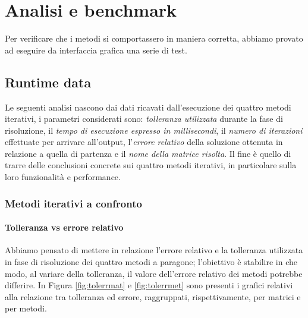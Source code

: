 \section{Analisi e benchmark}

Per verificare che i metodi si comportassero in maniera corretta, abbiamo provato ad eseguire da interfaccia grafica una serie di test.




\subsection{Runtime data}

Le seguenti analisi nascono dai dati ricavati dall'esecuzione dei quattro metodi iterativi, i parametri considerati sono: \textit{tolleranza utilizzata} durante la fase di risoluzione, il \textit{tempo di esecuzione espresso in millisecondi}, il \textit{numero di iterazioni} effettuate per arrivare all'output, l'\textit{errore relativo} della soluzione ottenuta in relazione a quella di partenza e il \textit{nome della matrice risolta}. Il fine è quello di trarre delle conclusioni concrete sui quattro metodi iterativi, in particolare sulla loro funzionalità e performance.

\subsubsection{Metodi iterativi a confronto}

\paragraph{Tolleranza vs errore relativo}
Abbiamo pensato di mettere in relazione l'errore relativo e la tolleranza utilizzata in fase di risoluzione dei quattro metodi a paragone; l'obiettivo è stabilire in che modo, al variare della tolleranza, il valore dell'errore relativo dei metodi potrebbe differire. In Figura \ref{fig:tolerrmat} e \ref{fig:tolerrmet} sono presenti i grafici relativi alla relazione tra tolleranza ed errore, raggruppati, rispettivamente, per matrici e per metodi.



